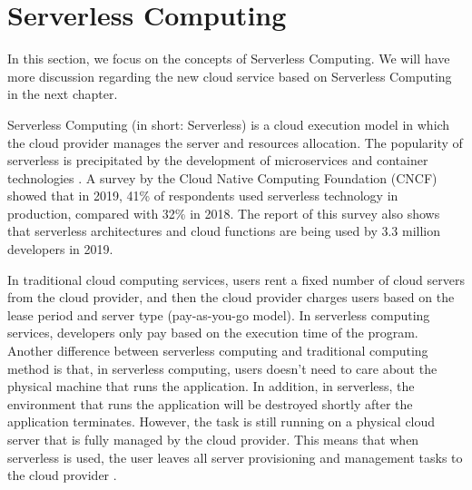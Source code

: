 \section{Serverless Computing}
In this section, we focus on the concepts of Serverless Computing. We will have more discussion regarding the new cloud service based on Serverless Computing in the next chapter.
\par
Serverless Computing (in short: Serverless) is a cloud execution model in which the cloud provider manages the server and resources allocation. 
The popularity of serverless is precipitated by the development of microservices and container technologies \cite{baldini2017serverless}. A survey by the Cloud Native Computing Foundation (CNCF) showed that in 2019, 41\% of respondents used serverless technology in production, compared with 32\% in 2018\cite{cncf2020}. The report of this survey also shows that serverless architectures and cloud functions are being used by 3.3 million developers \cite{cncf2020} in 2019.
\par
In traditional cloud computing services, users rent a fixed number of cloud servers from the cloud provider, and then the cloud provider charges users based on the lease period and server type (pay-as-you-go model). In serverless computing services, developers only pay based on the execution time of the program.
Another difference between serverless computing and traditional computing method is that, in serverless computing, users doesn't need to care about the physical machine that runs the application. In addition, in serverless, the environment that runs the application will be destroyed shortly after the application terminates. 
However, the task is still running on a physical cloud server that is fully managed by the cloud provider. This means that when serverless is used, the user leaves all server provisioning and management tasks to the cloud provider \cite{jonas2019cloud}.

